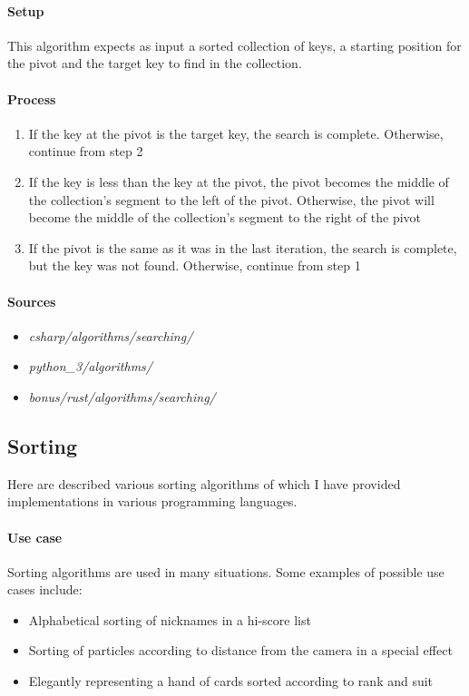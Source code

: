 \documentclass{article}
\begin{document}
\paragraph{Setup}
This algorithm expects as input a sorted collection of keys, a starting position for the pivot and the target key to find in
the collection.

\paragraph{Process}
\begin{enumerate}
\item{If the key at the pivot is the target key, the search is complete. Otherwise, continue from step 2}
\item{If the key is less than the key at the pivot, the pivot becomes the middle of the collection's segment to the left of the
    pivot. Otherwise, the pivot will become the middle of the collection's segment to the right of the pivot}
\item{If the pivot is the same as it was in the last iteration, the search is complete, but the key was not found. Otherwise,
    continue from step 1}
\end{enumerate}

\begin{samepage}
  \paragraph{Sources}
  \begin{itemize}
  \item{{\em csharp/algorithms/searching/}}
  \item{{\em python\_3/algorithms/}}
  \item{{\em bonus/rust/algorithms/searching/}}
  \end{itemize}
\end{samepage}


\subsection{Sorting}
Here are described various sorting algorithms of which I have provided implementations in various programming
languages.

\paragraph{Use case}
Sorting algorithms are used in many situations. Some examples of possible use cases include:
\begin{itemize}
\item{Alphabetical sorting of nicknames in a hi-score list}
\item{Sorting of particles according to distance from the camera in a special effect}
\item{Elegantly representing a hand of cards sorted according to rank and suit}
\end{itemize}
\end{document}
